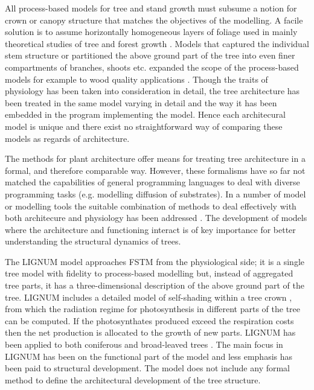 All  process-based  models  \citep{landsberg:86}  for tree  and  stand
growth  must subsume  a  notion  for crown  or  canopy structure  that
matches  the objectives  of the  modelling.  A  facile solution  is to
assume  horizontally  homogeneous layers  of  foliage  used in  mainly
theoretical     studies     of      tree     and     forest     growth
\citep{hari:82,sievanen:93}.  Models that captured the individual stem
structure or partitioned  the above ground part of  the tree into even
finer  compartments  of  branches,  shoots  etc.  \citep{kellomaki:95,
  makela:97-1}  expanded the  scope  of the  process-based models  for
example to wood  quality applications \citep{kellomaki:99, makela:03}.
Though the traits  of physiology has been taken  into consideration in
detail,  the tree  architecture has  been  treated in  the same  model
varying in  detail and  the way  it has been  embedded in  the program
implementing the  model.  Hence each architecural model  is unique and
there  exist  no straightforward  way  of  comparing  these models  as
regards of architecture.


The methods  for plant architecture \citep{pp:90,dereffye:97,godin:99}
offer means for treating tree  architecture in a formal, and therefore
comparable way. However, these formalisms  have so far not matched the
capabilities  of general  programming languages  to deal  with diverse
programming  tasks (e.g.   modelling  diffusion of  substrates). In  a
number of model or modelling tools the suitable combination of methods
to  deal effectively  with both  architecure and  physiology  has been
addressed \citep{kurth:99,  eschenbach:00, karwowski:03, yan:04}.  The
development of models where  the architecture and functioning interact
is of key importance  for better understanding the structural dynamics
of trees.

The LIGNUM model approaches FSTM  from the physiological side; it is a
single tree model  \citep{perttunen:96} with fidelity to process-based
modelling  \citep[see  e.g.][]{nikinmaa:92, sievanen:93,  makela:97-1}
but,  instead of  aggregated tree  parts, it  has  a three-dimensional
description of the  above ground part of the  tree.  LIGNUM includes a
detailed    model    of    self-shading    within   a    tree    crown
\citep{perttunen:96,  perttunen:01}, from  which the  radiation regime
for photosynthesis in different parts of the tree can be computed.  If
the photosynthates produced exceed  the respiration costs then the net
production is allocated  to the growth of new  parts.  LIGNUM has been
applied to both coniferous \citep{perttunen:96,lo:99} and broad-leaved
trees \citep{perttunen:01}.  The main focus  in LIGNUM has been on the
functional  part of  the  model and  less  emphasis has  been paid  to
structural development.  The model  does not include any formal method
to define the architectural development of the tree structure.

